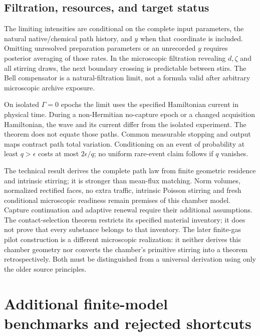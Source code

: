 \documentclass[11pt,oneside,openany]{book}
\theoremstyle{definition}
\theoremstyle{remark}\newtheorem{remark}[theorem]{Remark}
\begin{document}
\section{Filtration, resources, and target status}

The limiting intensities are conditional on the complete input parameters, the natural native/chemical path history, and $y$ when that coordinate is included. Omitting unresolved preparation parameters or an unrecorded $y$ requires posterior averaging of those rates. In the microscopic filtration revealing $d,\zeta$ and all stirring draws, the next boundary crossing is predictable between stirs. The Bell compensator is a natural-filtration limit, not a formula valid after arbitrary microscopic archive exposure.

On isolated $\Gamma=0$ epochs the limit uses the specified Hamiltonian current in physical time. During a non-Hermitian no-capture epoch or a changed acquisition Hamiltonian, the wave and its current differ from the isolated experiment. The theorem does not equate those paths. Common measurable stopping and output maps contract path total variation. Conditioning on an event of probability at least $q>\epsilon$ costs at most $2\epsilon/q$; no uniform rare-event claim follows if $q$ vanishes.

The technical result derives the complete path law from finite geometric residence and intrinsic stirring; it is stronger than mean-flux matching. Norm volumes, normalized rectified faces, no extra traffic, intrinsic Poisson stirring and fresh conditional microscopic readiness remain premises of this chamber model. Capture continuation and adaptive renewal require their additional assumptions. The contact-selection theorem restricts its specified material inventory; it does not prove that every substance belongs to that inventory. The later finite-gas pilot construction is a different microscopic realization: it neither derives this chamber geometry nor converts the chamber's primitive stirring into a theorem retrospectively. Both must be distinguished from a universal derivation using only the older source principles.



\chapter{Additional finite-model benchmarks and rejected shortcuts}
\label{bench:chapter}
\end{document}
